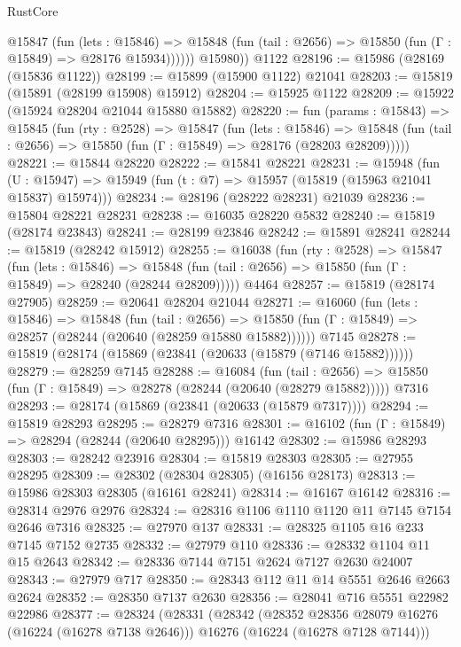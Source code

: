 \begin{lexlean}{RustCore}
\begin{coremodule}
            @15847
              (fun (lets : @15846) =>
              @15848 (fun (tail : @2656) => @15850 (fun (Γ : @15849) => @28176 @15934))))))
        @15980))
    @1122
@28196 := @15986 (@28169 (@15836 @1122))
@28199 := @15899 (@15900 @1122) @21041
@28203 := @15819 (@15891 (@28199 @15908) @15912)
@28204 := @15925 @1122
@28209 := @15922 (@15924 @28204 @21044 @15880 @15882)
@28220 := fun (params : @15843) =>
  @15845
    (fun (rty : @2528) =>
    @15847
      (fun (lets : @15846) =>
      @15848 (fun (tail : @2656) => @15850 (fun (Γ : @15849) => @28176 (@28203 @28209)))))
@28221 := @15844 @28220
@28222 := @15841 @28221
@28231 := @15948
    (fun (U : @15947) => @15949 (fun (t : @7) => @15957 (@15819 (@15963 @21041 @15837) @15974)))
@28234 := @28196 (@28222 @28231) @21039
@28236 := @15804 @28221 @28231
@28238 := @16035 @28220 @5832
@28240 := @15819 (@28174 @23843)
@28241 := @28199 @23846
@28242 := @15891 @28241
@28244 := @15819 (@28242 @15912)
@28255 := @16038
    (fun (rty : @2528) =>
    @15847
      (fun (lets : @15846) =>
      @15848 (fun (tail : @2656) => @15850 (fun (Γ : @15849) => @28240 (@28244 @28209)))))
    @4464
@28257 := @15819 (@28174 @27905)
@28259 := @20641 @28204 @21044
@28271 := @16060
    (fun (lets : @15846) =>
    @15848
      (fun (tail : @2656) =>
      @15850 (fun (Γ : @15849) => @28257 (@28244 (@20640 (@28259 @15880 @15882))))))
    @7145
@28278 := @15819 (@28174 (@15869 (@23841 (@20633 (@15879 (@7146 @15882))))))
@28279 := @28259 @7145
@28288 := @16084
    (fun (tail : @2656) => @15850 (fun (Γ : @15849) => @28278 (@28244 (@20640 (@28279 @15882)))))
    @7316
@28293 := @28174 (@15869 (@23841 (@20633 (@15879 @7317))))
@28294 := @15819 @28293
@28295 := @28279 @7316
@28301 := @16102 (fun (Γ : @15849) => @28294 (@28244 (@20640 @28295))) @16142
@28302 := @15986 @28293
@28303 := @28242 @23916
@28304 := @15819 @28303
@28305 := @27955 @28295
@28309 := @28302 (@28304 @28305) (@16156 @28173)
@28313 := @15986 @28303 @28305 (@16161 @28241)
@28314 := @16167 @16142
@28316 := @28314 @2976 @2976
@28324 := @28316 @1106 @1110 @1120 @11 @7145 @7154 @2646 @7316
@28325 := @27970 @137
@28331 := @28325 @1105 @16 @233 @7145 @7152 @2735
@28332 := @27979 @110
@28336 := @28332 @1104 @11 @15 @2643
@28342 := @28336 @7144 @7151 @2624 @7127 @2630 @24007
@28343 := @27979 @717
@28350 := @28343 @112 @11 @14 @5551 @2646 @2663 @2624
@28352 := @28350 @7137 @2630
@28356 := @28041 @716 @5551 @22982 @22986
@28377 := @28324
    (@28331
      (@28342
        (@28352 @28356 @28079 @16276 (@16224 (@16278 @7138 @2646)))
        @16276
        (@16224 (@16278 @7128 @7144)))

\end{coremodule}
\end{lexlean}
